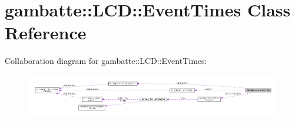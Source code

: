 \hypertarget{classgambatte_1_1LCD_1_1EventTimes}{}\section{gambatte\+:\+:L\+CD\+:\+:Event\+Times Class Reference}
\label{classgambatte_1_1LCD_1_1EventTimes}


Collaboration diagram for gambatte\+:\+:L\+CD\+:\+:Event\+Times\+:
\nopagebreak
\begin{figure}[H]
\begin{center}
\leavevmode
\includegraphics[width=350pt]{classgambatte_1_1LCD_1_1EventTimes__coll__graph}
\end{center}
\end{figure}
